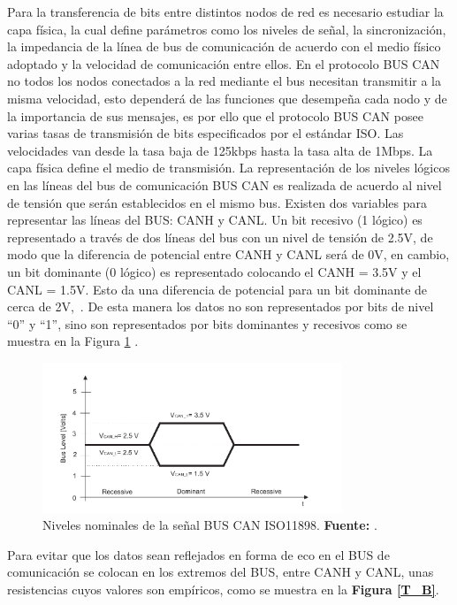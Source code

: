 Para la transferencia de bits entre distintos nodos de red es necesario estudiar la capa física, la cual define parámetros como los niveles de señal, la sincronización, la impedancia de la línea de bus de comunicación de acuerdo con el medio físico adoptado y la velocidad de comunicación entre ellos. En el protocolo BUS CAN no todos los nodos conectados a la red mediante el bus necesitan transmitir a la misma velocidad, esto dependerá de las funciones que desempeña cada nodo y de la importancia de sus mensajes, es por ello que el protocolo BUS CAN posee varias tasas de transmisión de bits especificados  por el estándar ISO. Las velocidades van desde la tasa baja de 125kbps hasta la tasa alta de 1Mbps.
La capa física define el medio de transmisión. La representación de los niveles lógicos en las líneas del bus de comunicación BUS CAN es realizada de acuerdo al nivel de tensión que serán establecidos en el mismo bus. Existen dos variables para representar las líneas del BUS: CANH y CANL. Un bit recesivo (1 lógico) es representado a través de dos líneas del bus con un nivel de tensión de 2.5V, de modo que la diferencia de potencial entre CANH  y CANL será de 0V, en cambio, un bit dominante (0 lógico) es representado colocando el CANH = 3.5V y el CANL = 1.5V. Esto da una diferencia de potencial para un bit dominante de cerca de 2V,~\cite{PSMR}. De esta manera los datos no son representados por bits de nivel “0” y “1”, sino son representados por bits dominantes y recesivos como se muestra en la Figura \ref{N_N} . 


\begin{figure}[H]
	\centering
		\includegraphics[width=0.8\textwidth]{./Cap2imagen/niveles.pdf}
	\caption[Niveles nominales de la señal BUS CAN ISO 11898.]{Niveles nominales de la señal BUS CAN ISO11898.\textbf{ Fuente:} \cite{PSMR}.}
	\label{N_N} %
\end{figure}

Para evitar que los datos sean reflejados en forma de eco en el BUS de comunicación se colocan en los extremos del BUS, entre CANH y CANL, unas resistencias cuyos valores son empíricos, como se muestra en la \textbf{Figura \ref{T_B}}. 



